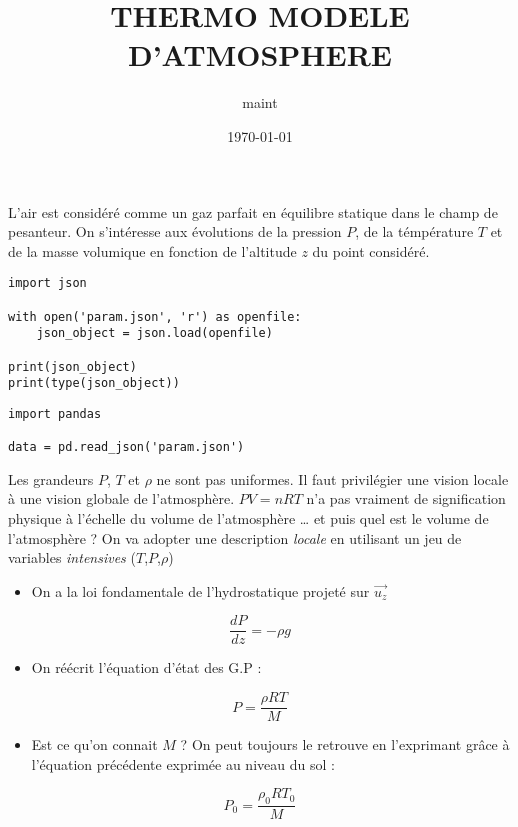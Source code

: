 \documentclass[11pt]{article}
\author{maint}
\date{\today}
\title{THERMO MODELE D'ATMOSPHERE}
\begin{document}
\tableofcontents

L'air est considéré comme un gaz parfait en équilibre statique dans le champ de pesanteur. On s'intéresse aux évolutions de la pression \(P\), de la témpérature \(T\) et de la masse volumique en fonction de l'altitude \(z\) du point considéré.

\begin{verbatim}
import json

with open('param.json', 'r') as openfile:
    json_object = json.load(openfile)

print(json_object)
print(type(json_object))
\end{verbatim}


\begin{verbatim}
import pandas

data = pd.read_json('param.json')
\end{verbatim}


Les grandeurs \(P\), \(T\) et \(\rho\) ne sont pas uniformes. Il faut privilégier une vision locale à une vision globale de l'atmosphère. \(PV=nRT\) n'a pas vraiment de signification physique à l'échelle du volume de l'atmosphère \ldots{} et puis quel est le volume de l'atmosphère ? On va adopter une description \emph{locale} en utilisant un jeu de variables \emph{intensives} (\(T\),\(P\),\(\rho\))

\begin{itemize}
\item On a la loi fondamentale de l'hydrostatique projeté sur \(\vec{u_z}\)
\end{itemize}

$$ \frac{dP}{dz} = - \rho g $$


\begin{itemize}
\item On réécrit l'équation d'état des G.P :
\end{itemize}

$$ P = \frac{\rho R T }{M}$$

\begin{itemize}
\item Est ce qu'on connait \(M\) ? On peut toujours le retrouve en l'exprimant grâce à l'équation précédente exprimée au niveau du sol :
\end{itemize}

$$ P_0 = \frac{\rho_0 R T_0 }{M}$$
\end{document}
